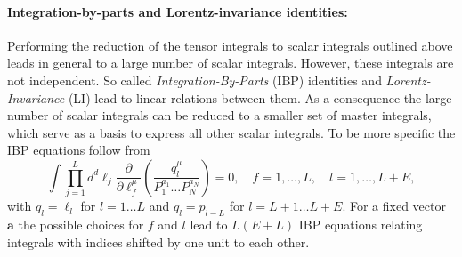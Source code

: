 \documentclass[a4paper,12pt]{scrartcl}
\newcommand*{\bm}{\boldsymbol}
\begin{document}
\paragraph{Integration-by-parts and Lorentz-invariance identities:}
Performing the reduction of the tensor integrals to scalar integrals
outlined above leads in general to a large number of scalar integrals.
However, these integrals are not independent. So called \textit{
  Integration-By-Parts} (IBP) identities
\cite{Tkachov:1981wb,Chetyrkin:1981qh} and \textit{
  Lorentz-Invariance} (LI) \cite{Gehrmann:1999as} lead to linear
relations between them. As a consequence the large number of scalar
integrals can be reduced to a smaller set of master integrals, which
serve as a basis to express all other scalar integrals. To be more
specific the IBP equations follow from
\begin{equation}
  \int\prod\limits^{L}_{j=1}d^{d}\ell_{j}
  \frac{\partial}{\partial\ell_f^\mu}
  \left(\frac{q_l^\mu}{P_1^{a_1} \ldots P_N^{a_{N}}}\right) = 0,
  \quad f=1,\dots,L, \quad l=1,\dots,L+E,
  \label{eq:Definition IBP2}
\end{equation}
with $q_l = \ell_l$ for $l = 1\ldots L$ and $q_l = p_{l-L}$ for
$l=L+1\ldots L+E$. For a fixed vector $\bm{a}$ the possible choices
for $f$ and $l$ lead to $L(E+L)$ IBP equations relating integrals with
indices shifted by one unit to each other.
\end{document}
